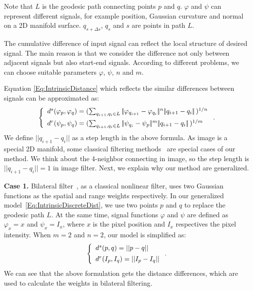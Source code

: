 Note that $L$ is the geodesic path connecting points $p$ and $q$.
$\varphi$ and $\psi$ can represent different signals, for example position, Gaussian curvature and normal on a 2D manifold surface.
$q_{s + \Delta{s}}$, $q_s$ and $s$ are points in path $L$.

The cumulative difference of input signal can reflect the local structure of desired signal.
The main reason is that we consider the difference not only between adjacent signals but also start-end signals.
According to different problems, we can choose suitable parameters $\varphi$, $\psi$, $n$ and $m$.

Equation \ref{Eq:IntrinsicDistance} which reflects the similar differences between signals can be approximated as:
 \begin{equation}
 \label{Eq:IntrinsicDiscreteDist}
 \left \{
 \begin{array}{ll}
        d^{s}(\varphi_p, \varphi_q) = (\sum_{q_{i+1}, q_i \in{L}}|\!|\varphi_{q_{i+1}} - \varphi_{q_i}|\!|^{n}|\!|q_{i+1} - q_{i}|\!|\,)^{1/n} \vspace{1.5mm}\\
        d^{r}(\psi_p, \psi_q) = (\sum_{q_{i+1}, q_i \in{L}}|\!|\psi_{q_i} - \psi_{p}|\!|^{m}|\!|q_{i+1} - q_{i}|\!|\,)^{1/m}
 \end{array}
 \right. .
 \end{equation}
We define $|\!|q_{i+1} - q_{i}|\!|$ as a step length in the above formula.
As image is a special 2D manifold, some classical filtering methods~\cite{tomasi1998bilateral, grazzini2009edge, Chang2015propagated} are special cases of our method.
We think about the 4-neighbor connecting in image, so the step length is $||q_{i+1} - q_{i}|| = 1$ in image filter. %
Next, we explain why our method are generalized.

{\bfseries Case 1.}
Bilateral filter~\cite{tomasi1998bilateral}, as a classical nonlinear filter, uses two Gaussian functions as the spatial and range weights respectively.
In our generalized model~\ref{Eq:IntrinsicDiscreteDist}, we use two points $p$ and $q$ to replace the geodesic path $L$.
At the same time, signal functions $\varphi$ and $\psi$ are defined as $\varphi_{x} = x$ and $\psi_{x} = I_x$,
where $x$ is the pixel position and $I_x$ respectives the pixel intensity.
When $m=2$ and $n=2$, our model is simplified as:
\begin{equation}
\label{Eq:BilateralDistance}
\left \{
\begin{array}{ll}
        d^{s}(p, q) = ||p - q|| \vspace{1.5mm}\\
        d^{r}(I_{p}, I_{q}) = || I_{p} - I_{q} || \\
\end{array}
\right. .
\end{equation}
We can see that the above formulation gets the distance differences, which are used to calculate the weights in bilateral filtering.

